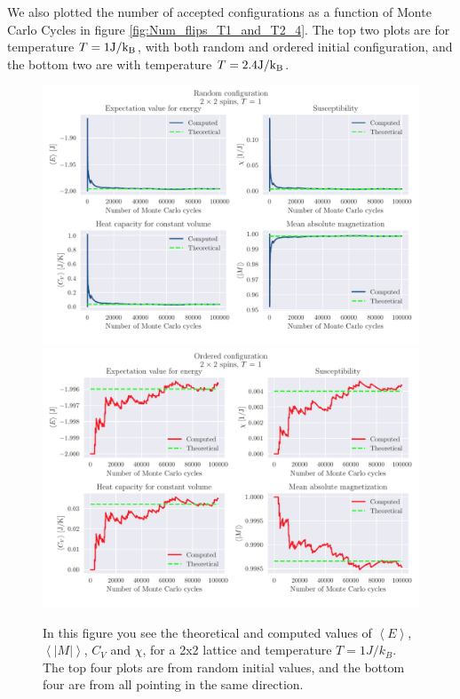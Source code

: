 \documentclass[reprint, english,notitlepage,nofootinbib]{revtex4-1}  %
\begin{document}
We also plotted the number of accepted configurations as a function of Monte Carlo Cycles in figure \ref{fig:Num_flips_T1_and_T2_4}. The top two plots are for temperature $T=1\rm{J}/k_B$, with both random and ordered initial configuration, and the bottom two are with temperature $T=2.4\rm{J}/k_B$.
\begin{figure}[!htb]
	\includegraphics[width=16cm]{../output/c/L2-T1-dT0_0-NT1-N5-RandomTrue_comp.pdf}
	\includegraphics[width=16cm]{../output/c/L2-T1-dT0_0-NT1-N5-RandomFalse_comp.pdf}
	\caption{In this figure you see the theoretical and computed values of $\left<E\right>$, $\left<|M|\right>$, $C_V$ and $\chi$, for a 2x2 lattice and temperature $T=1J/k_B$. The top four plots are from random initial values, and the bottom four are from all pointing in the same direction.}
	\label{fig:L2_T1_Random_and_not}
\end{figure}
\end{document}

